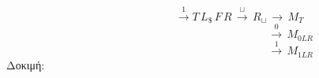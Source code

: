 \reducevspace\reducevspace\reducevspace\reducevspace\reducevspace\reducevspace\reducevspace\reducevspace\reducevspace
\reducevspace\reducevspace\reducevspace\reducevspace\reducevspace\reducevspace\reducevspace\reducevspace\reducevspace
\reducevspace\reducevspace\reducevspace\reducevspace\reducevspace\reducevspace\reducevspace\reducevspace\reducevspace
\reducevspace\reducevspace\reducevspace\reducevspace\reducevspace\reducevspace\reducevspace\reducevspace\reducevspace
\[\qquad\qquad\qquad\, \xrightarrow{1} T\, L_\$\, F\, R\, \xrightarrow{\sqcup}\, R_\sqcup\, \rightarrow\, M_T
\]
\reducevspace\reducevspace\reducevspace\reducevspace\reducevspace\reducevspace\reducevspace
\reducevspace\reducevspace\reducevspace\reducevspace\reducevspace\reducevspace\reducevspace
\reducevspace\reducevspace\reducevspace\reducevspace\reducevspace\reducevspace\reducevspace
\reducevspace\reducevspace\reducevspace\reducevspace\reducevspace\reducevspace\reducevspace
\[\qquad\qquad\qquad\qquad\qquad\qquad\qquad\quad\;\, \xrightarrow{0}\, M_{0LR}\]
\reducevspace\reducevspace\reducevspace\reducevspace\reducevspace\reducevspace\reducevspace
\reducevspace\reducevspace\reducevspace\reducevspace\reducevspace\reducevspace\reducevspace
\reducevspace\reducevspace\reducevspace\reducevspace\reducevspace\reducevspace\reducevspace
\reducevspace\reducevspace\reducevspace\reducevspace\reducevspace\reducevspace\reducevspace
\[\qquad\qquad\qquad\qquad\qquad\qquad\qquad\quad\;\, \xrightarrow{1}\, M_{1LR}\]
\reducevspace\reducevspace\reducevspace\reducevspace\reducevspace\reducevspace\reducevspace\reducevspace\reducevspace
Δοκιμή:
\reducevspace\reducevspace\reducevspace\reducevspace\reducevspace\reducevspace\reducevspace\reducevspace\reducevspace
